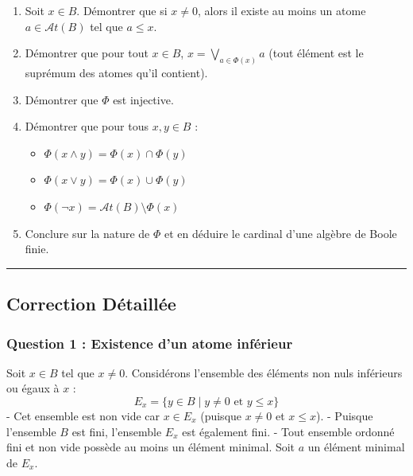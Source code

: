 \documentclass[11pt,a4paper]{article}
\begin{document}
\begin{enumerate}
\def\labelenumi{\arabic{enumi}.}
\tightlist
\item
  Soit \(x \in B\). Démontrer que si \(x \neq 0\), alors il existe au
  moins un atome \(a \in \mathcal{A}t(B)\) tel que \(a \le x\).
\item
  Démontrer que pour tout \(x \in B\), \(x = \bigvee_{a \in \Phi(x)} a\)
  (tout élément est le suprémum des atomes qu'il contient).
\item
  Démontrer que \(\Phi\) est injective.
\item
  Démontrer que pour tous \(x, y \in B\) :

  \begin{itemize}
  \tightlist
  \item
    \(\Phi(x \land y) = \Phi(x) \cap \Phi(y)\)
  \item
    \(\Phi(x \lor y) = \Phi(x) \cup \Phi(y)\)
  \item
    \(\Phi(\neg x) = \mathcal{A}t(B) \setminus \Phi(x)\)
  \end{itemize}
\item
  Conclure sur la nature de \(\Phi\) et en déduire le cardinal d'une
  algèbre de Boole finie.
\end{enumerate}

\begin{center}\rule{0.5\linewidth}{0.5pt}\end{center}

\hypertarget{correction-duxe9tailluxe9e}{%
\subsection{Correction Détaillée}\label{correction-duxe9tailluxe9e}}

\hypertarget{question-1-existence-dun-atome-infuxe9rieur}{%
\subsubsection{Question 1 : Existence d'un atome
inférieur}\label{question-1-existence-dun-atome-infuxe9rieur}}

Soit \(x \in B\) tel que \(x \neq 0\). Considérons l'ensemble des
éléments non nuls inférieurs ou égaux à \(x\) :
\[E_x = \{y \in B \mid y \neq 0 \text{ et } y \le x\}\] - Cet ensemble
est non vide car \(x \in E_x\) (puisque \(x \neq 0\) et \(x \le x\)). -
Puisque l'ensemble \(B\) est fini, l'ensemble \(E_x\) est également
fini. - Tout ensemble ordonné fini et non vide possède au moins un
élément minimal. Soit \(a\) un élément minimal de \(E_x\).
\end{document}
